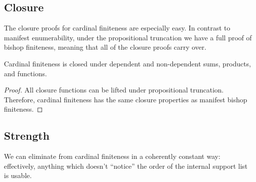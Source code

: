 \subsection{Closure}
The closure proofs for cardinal finiteness are especially easy.
In contrast to manifest enumerability, under the propositional truncation we
have a full proof of bishop finiteness, meaning that all of the closure proofs
carry over.
\begin{rm-lemma}
  Cardinal finiteness is closed under dependent and non-dependent sums,
  products, and functions.
\end{rm-lemma}
\begin{proof}
  All closure functions can be lifted under propositional truncation.
  Therefore, cardinal finiteness has the same closure properties as manifest
  bishop finiteness.
\end{proof}
\subsection{Strength}
We can eliminate from cardinal finiteness in a coherently constant way:
effectively, anything which doesn't ``notice'' the order of the internal support
list is usable.

